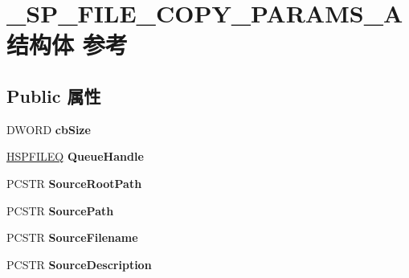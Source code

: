 \hypertarget{struct___s_p___f_i_l_e___c_o_p_y___p_a_r_a_m_s___a}{}\section{\+\_\+\+S\+P\+\_\+\+F\+I\+L\+E\+\_\+\+C\+O\+P\+Y\+\_\+\+P\+A\+R\+A\+M\+S\+\_\+\+A结构体 参考}
\label{struct___s_p___f_i_l_e___c_o_p_y___p_a_r_a_m_s___a}
\subsection*{Public 属性}
\begin{DoxyCompactItemize}
\item 
\mbox{\label{struct___s_p___f_i_l_e___c_o_p_y___p_a_r_a_m_s___a_a1646d6b95a29f3651e1a6b6f88788b94}} 
D\+W\+O\+RD {\bfseries cb\+Size}
\item 
\mbox{\label{struct___s_p___f_i_l_e___c_o_p_y___p_a_r_a_m_s___a_af932dbf0dee9158c1c8a470ccf195261}} 
\hyperlink{interfacevoid}{H\+S\+P\+F\+I\+L\+EQ} {\bfseries Queue\+Handle}
\item 
\mbox{\label{struct___s_p___f_i_l_e___c_o_p_y___p_a_r_a_m_s___a_a0437db3c6f6aa3ca1b0ef4f092d1ccde}} 
P\+C\+S\+TR {\bfseries Source\+Root\+Path}
\item 
\mbox{\label{struct___s_p___f_i_l_e___c_o_p_y___p_a_r_a_m_s___a_a63008496011f2d527f2241c6a158f075}} 
P\+C\+S\+TR {\bfseries Source\+Path}
\item 
\mbox{\label{struct___s_p___f_i_l_e___c_o_p_y___p_a_r_a_m_s___a_a0464bdf5adcc1db4f8aa1c2228f1e2a0}} 
P\+C\+S\+TR {\bfseries Source\+Filename}
\item 
\mbox{\label{struct___s_p___f_i_l_e___c_o_p_y___p_a_r_a_m_s___a_a0297984eca54735d5713930552e1bf2b}} 
P\+C\+S\+TR {\bfseries Source\+Description}
\item 

\end{DoxyCompactItemize}
